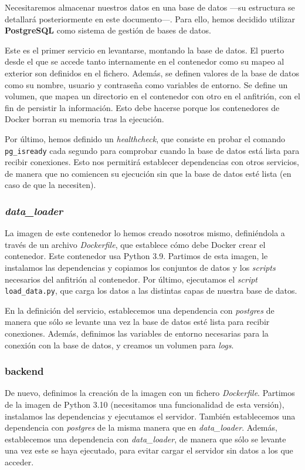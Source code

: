 \documentclass[11pt,a4paper]{article}
\begin{document}
Necesitaremos almacenar nuestros datos en una base de datos ---su estructura se detallará posteriormente en este documento---. Para ello, hemos decidido utilizar \textbf{PostgreSQL} como sistema de gestión de bases de datos.

Este es el primer servicio en levantarse, montando la base de datos. El puerto desde el que se accede tanto internamente en el contenedor como su mapeo al exterior son definidos en el fichero. Además, se definen valores de la base de datos como su nombre, usuario y contraseña como variables de entorno. Se define un volumen, que mapea un directorio en el contenedor con otro en el anfitrión, con el fin de persistir la información. Esto debe hacerse porque los contenedores de Docker borran su memoria tras la ejecución.

Por último, hemos definido un \textit{healthcheck}, que consiste en probar el comando \lstinline!pg_isready! cada segundo para comprobar cuando la base de datos está lista para recibir conexiones. Esto nos permitirá establecer dependencias con otros servicios, de manera que no comiencen su ejecución sin que la base de datos esté lista (en caso de que la necesiten).

\subsubsection*{\textit{data\_loader}}

La imagen de este contenedor lo hemos creado nosotros mismo, definiéndola a través de un archivo \textit{Dockerfile}, que establece cómo debe Docker crear el contenedor. Este contenedor usa Python 3.9. Partimos de esta imagen, le instalamos las dependencias y copiamos los conjuntos de datos y los \textit{scripts} necesarios del anfitrión al contenedor. Por último, ejecutamos el \textit{script} \lstinline!load_data.py!, que carga los datos a las distintas capas de nuestra base de datos.

En la definición del servicio, establecemos una dependencia con \textit{postgres} de manera que sólo se levante una vez la base de datos esté lista para recibir conexiones. Además, definimos las variables de entorno necesarias para la conexión con la base de datos, y creamos un volumen para \textit{logs}.

\subsubsection*{backend} 

De nuevo, definimos la creación de la imagen con un fichero \textit{Dockerfile}. Partimos de la imagen de Python 3.10 (necesitamos una funcionalidad de esta versión), instalamos las dependencias y ejecutamos el servidor. También establecemos una dependencia con \textit{postgres} de la misma manera que en \textit{data\_loader}. Además, establecemos una dependencia con \textit{data\_loader}, de manera que sólo se levante una vez este se haya ejecutado, para evitar cargar el servidor sin datos a los que acceder.
\end{document}
